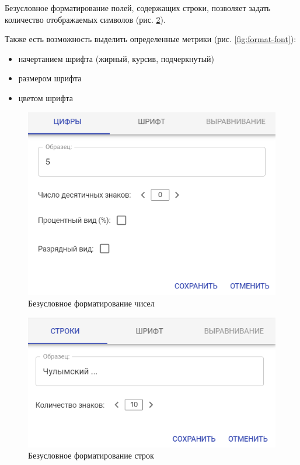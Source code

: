 \documentclass[../user-manual.tex]{subfiles}
\begin{document}
	Безусловное форматирование полей, содержащих строки, позволяет задать количество отображаемых символов (рис. \ref{fig:format-string}).
	
	Также есть возможность выделить определенные метрики (рис. \ref{fig:format-font}):
	\begin{itemize}
	
		\item начертанием шрифта (жирный, курсив, подчеркнутый)
	
		\item размером шрифта
	
		\item цветом шрифта
	\end{itemize}
	\begin{figure}[h!]
		\centering
		\includegraphics[width=\graphicswidth]{img/11-format-number.png}
		\caption{Безусловное форматирование чисел}
		\label{fig:format-number}
	\end{figure}
	\begin{figure}[h!]
		\centering
		\includegraphics[width=\graphicswidth]{img/12-format-string.png}
		\caption{Безусловное форматирование строк}
		\label{fig:format-string}
	\end{figure}
\end{document}
